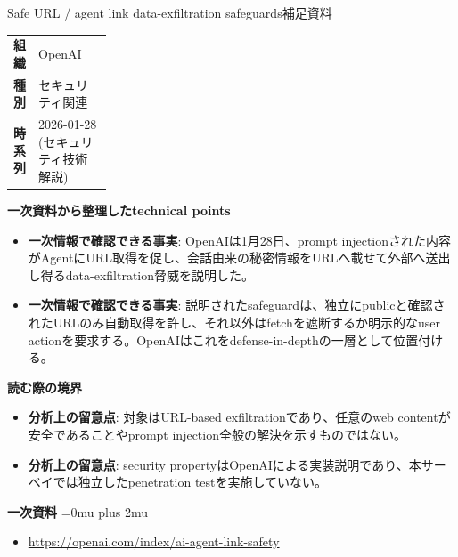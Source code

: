 \begin{technicalnote}{Safe URL / agent link data-exfiltration safeguards}{補足資料}
\begingroup
\begin{tabularx}{\linewidth}{@{}>{\bfseries}p{0.22\linewidth}X@{}}
組織 & OpenAI \\
種別 & セキュリティ関連 \\
時系列 & 2026-01-28 (セキュリティ技術解説) \\
\end{tabularx}
\smallskip
{\bfseries 一次資料から整理したtechnical points}
\begin{itemize}[leftmargin=1.5em,itemsep=0.35em]
\item \textbf{一次情報で確認できる事実}: OpenAIは1月28日、prompt injectionされた内容がAgentにURL取得を促し、会話由来の秘密情報をURLへ載せて外部へ送出し得るdata-exfiltration脅威を説明した。
\item \textbf{一次情報で確認できる事実}: 説明されたsafeguardは、独立にpublicと確認されたURLのみ自動取得を許し、それ以外はfetchを遮断するか明示的なuser actionを要求する。OpenAIはこれをdefense-in-depthの一層として位置付ける。
\end{itemize}
\begin{minipage}{\linewidth}
{\bfseries 読む際の境界}
\begin{itemize}[leftmargin=1.5em,itemsep=0.35em]
\item \textbf{分析上の留意点}: 対象はURL-based exfiltrationであり、任意のweb contentが安全であることやprompt injection全般の解決を示すものではない。
\item \textbf{分析上の留意点}: security propertyはOpenAIによる実装説明であり、本サーベイでは独立したpenetration testを実施していない。
\end{itemize}
\begin{samepage}
{\bfseries 一次資料}
\begingroup\sloppy
\Urlmuskip=0mu plus 2mu\relax
\begin{itemize}[leftmargin=1.5em,itemsep=0.25em]
\item {\scriptsize\url{https://openai.com/index/ai-agent-link-safety}}
\end{itemize}
\endgroup
\end{samepage}
\end{minipage}
\endgroup
\end{technicalnote}
\medskip

